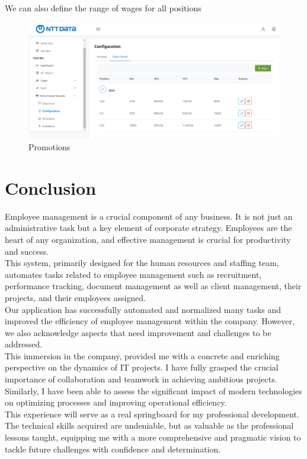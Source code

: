 \documentclass[12pt,a4paper,table,english]{article}
\begin{document}
	We can also define the range of wages for all positions
	\begin{figure}[H]
	\centering
	\includegraphics[width=150mm]{Image/confband}
	\caption{Promotions}
	\label{fig:Promotions}
	\end{figure}



	\section{Conclusion}

	Employee management is a crucial component of any business. It is not just an administrative task but a key element of corporate strategy. Employees are the heart of any organization, and effective management is crucial for productivity and success. \\
	This system, primarily designed for the human resources and staffing team, automates tasks related to employee management such as recruitment, performance tracking, document management as well as client management, their projects, and their employees assigned.\\
	
	Our application has successfully automated and normalized many tasks and improved the efficiency of employee management within the company. However, we also acknowledge aspects that need improvement and challenges to be addressed.\\
	
	This immersion in the company, provided me with a concrete and enriching perspective on the dynamics of IT projects. I have fully grasped the crucial importance of collaboration and teamwork in achieving ambitious projects. Similarly, I have been able to assess the significant impact of modern technologies on optimizing processes and improving operational efficiency.\\
	
	This experience will serve as a real springboard for my professional development. The technical skills acquired are undeniable, but as valuable as the professional lessons taught, equipping me with a more comprehensive and pragmatic vision to tackle future challenges with confidence and determination.
	

	\newpage
	
	
	\newpage

	
	\newpage
	
	
\end{document}
